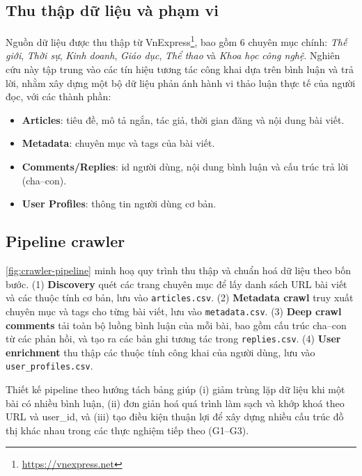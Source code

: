 \documentclass[11pt]{article}
\begin{document}
\subsection{Thu thập dữ liệu và phạm vi}
Nguồn dữ liệu được thu thập từ VnExpress\footnote{\url{https://vnexpress.net}}, bao gồm 6 chuyên mục chính: \textit{Thế giới}, \textit{Thời sự}, \textit{Kinh doanh}, \textit{Giáo dục}, \textit{Thể thao} và \textit{Khoa học công nghệ}.
Nghiên cứu này tập trung vào các tín hiệu tương tác công khai dựa trên bình luận và trả lời,
nhằm xây dựng một bộ dữ liệu phản ánh hành vi thảo luận thực tế của người đọc, với các thành phần:
\begin{itemize}
    \item \textbf{Articles}: tiêu đề, mô tả ngắn, tác giả, thời gian đăng và nội dung bài viết.
    \item \textbf{Metadata}: chuyên mục và tags của bài viết.
    \item \textbf{Comments/Replies}: id người dùng, nội dung bình luận và cấu trúc trả lời (cha--con).
    \item \textbf{User Profiles}: thông tin người dùng cơ bản.
\end{itemize}

\subsection{Pipeline crawler}
\autoref{fig:crawler-pipeline} minh hoạ quy trình thu thập và chuẩn hoá dữ liệu theo bốn bước.
(1) \textbf{Discovery} quét các trang chuyên mục để lấy danh sách URL bài viết và các thuộc tính cơ bản,
lưu vào \texttt{articles.csv}.
(2) \textbf{Metadata crawl} truy xuất chuyên mục và tags cho từng bài viết,
lưu vào \texttt{metadata.csv}.
(3) \textbf{Deep crawl comments} tải toàn bộ luồng bình luận của mỗi bài,
bao gồm cấu trúc cha--con từ các phản hồi, và tạo ra các bản ghi tương tác trong \texttt{replies.csv}.
(4) \textbf{User enrichment} thu thập các thuộc tính công khai của người dùng,
lưu vào \texttt{user\_profiles.csv}.

Thiết kế pipeline theo hướng tách bảng giúp (i) giảm trùng lặp dữ liệu khi một bài có nhiều bình luận,
(ii) đơn giản hoá quá trình làm sạch và khớp khoá theo URL và user\_id,
và (iii) tạo điều kiện thuận lợi để xây dựng nhiều cấu trúc đồ thị khác nhau
trong các thực nghiệm tiếp theo (G1--G3).
\end{document}
